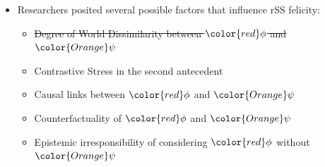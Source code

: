 \begin{frame}[t]
\subsectionpage\vskip 9pt
\begin{itemize}
    \item<1->	Researchers posited several possible factors that influence rSS felicity:\vskip 18pt
			\begin{itemize}
                \item<1->	{\sout{Degree of World Dissimilarity between ${\color{red}\phi}$ and ${\color{Orange}\psi}$}} \citep{Lewis2017,Krassnig2017}\vskip 18pt
                \item<1->   Contrastive Stress in the second antecedent \citep{Klecha2014a,krassnig2022ReverseSobel}\vskip 9pt
				\item<1->	{Causal links between ${\color{red}\phi}$ and ${\color{Orange}\psi}$} \citep{Klecha2014a}\vskip 9pt
                \item<1->   Counterfactuality of ${\color{red}\phi}$ and ${\color{Orange}\psi}$ \citep{krassnig2022ReverseSobel}\vskip 9pt
				\item<1->	{Epistemic irresponsibility of considering ${\color{red}\phi}$ without ${\color{Orange}\psi}$} \citep{Moss2012}
			\end{itemize}
\end{itemize}
\end{frame}

